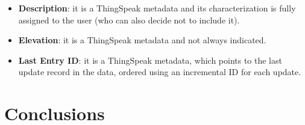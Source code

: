 \documentclass[conference]{IEEEtran}
\begin{document}
\begin{itemize}
 \item \textbf{Description}: it is a ThingSpeak metadata and its characterization is fully assigned to the user (who can also decide not to include it).
 \item \textbf{Elevation}: it is a ThingSpeak metadata and not always indicated.
 \item \textbf{Last Entry ID}: it is a ThingSpeak metadata, which points to the last update record in the data, ordered using an incremental ID for each update.
\end{itemize}


\section{Conclusions}







\end{document}
